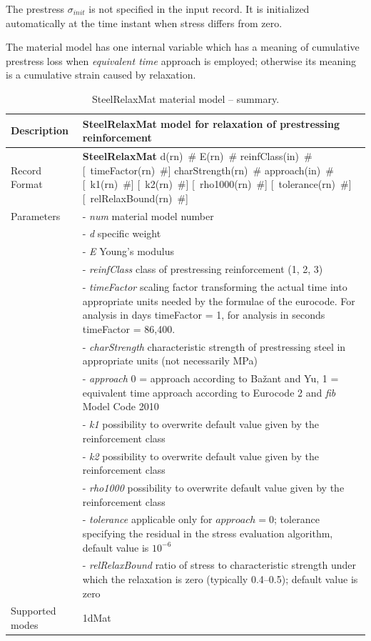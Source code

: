 \documentclass[a4paper]{article}
\newcommand{\descitem}[1]{{\noindent \bf #1}}
\newcommand{\elemparam}[2]{{{#1\tiny (#2)}~\#}}
\newcommand{\optelemparam}[2]{[{~\elemparam{#1}{#2}}]}
\newcommand{\param}[1]{{\it #1}}
\newenvironment{mmt}{\begin{tabular}{|l|p{9cm}|}}{\end{tabular}\\}
\newenvironment{mmt}{\begin{tabular}{|l|l|}}{\end{tabular}\\}
\begin{document}
The prestress $\sigma_{init}$ is not specified in the input record. It
is initialized automatically at the time instant when stress differs
from zero.

The material model has one internal variable which has a meaning of
cumulative prestress loss when {\sl{equivalent time}} approach is
employed; otherwise its meaning is a cumulative strain caused by
relaxation.

\begin{table}[!htb]
\begin{mmt}
\hline
Description & SteelRelaxMat model for relaxation of prestressing reinforcement\\
\hline
Record Format & \descitem{SteelRelaxMat}  
\elemparam{d}{rn}
\elemparam{E}{rn}
\elemparam{reinfClass}{in}
\optelemparam{timeFactor}{rn}
\elemparam{charStrength}{rn} 
\elemparam{approach}{in} 
\optelemparam{k1}{rn}
\optelemparam{k2}{rn}
\optelemparam{rho1000}{rn}
\optelemparam{tolerance}{rn}
\optelemparam{relRelaxBound}{rn}\\
Parameters &- \param{num} material model number\\
&- \param{d} specific weight\\
&- \param{E} Young's modulus \\
&- \param{reinfClass} class of prestressing reinforcement (1, 2, 3) \\
&- \param{timeFactor} scaling factor transforming the actual time into
appropriate units needed by the formulae of the eurocode. For analysis
in days timeFactor = 1, for analysis in seconds timeFactor = 86,400.\\
&- \param{charStrength} characteristic strength of prestressing steel
in appropriate units (not necessarily MPa)\\
&- \param{approach} 0 = approach according to Ba\v{z}ant and Yu, 1 =
equivalent time approach according to Eurocode 2 and {\sl{fib}} Model Code 2010 \\
&- \param{k1} possibility to overwrite default value given by the
reinforcement class\\
&- \param{k2} possibility to overwrite default value given by the
reinforcement class\\
&- \param{rho1000} possibility to overwrite default value given by the
reinforcement class\\
&- \param{tolerance} applicable only for $approach = 0$; tolerance
specifying the residual in the stress evaluation algorithm, default
value is $10^{-6}$\\
&- \param{relRelaxBound} ratio of stress to characteristic strength
under which the relaxation is zero (typically 0.4--0.5); default
value is zero\\


Supported modes& 1dMat\\
\hline
\end{mmt}
\caption{SteelRelaxMat material model -- summary.}
\label{steelRelax_table}
\end{table}
\end{document}
